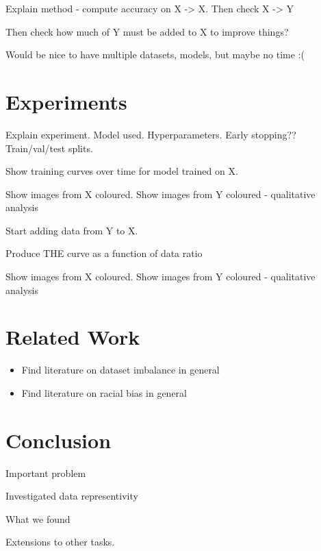 \documentclass[conference]{IEEEtran}
\begin{document}
Explain method - compute accuracy on X -> X.
Then check X -> Y

Then check how much of Y must be added to X to improve things?

Would be nice to have multiple datasets, models, but maybe no time :(

\section{Experiments}

Explain experiment. Model used. Hyperparameters. Early stopping?? Train/val/test splits.

Show training curves over time for model trained on X. 

Show images from X coloured.
Show images from Y coloured - qualitative analysis

Start adding data from Y to X. 

Produce THE curve as a function of data ratio

Show images from X coloured.
Show images from Y coloured - qualitative analysis



\section{Related Work}

\begin{itemize}
    \item Find literature on dataset imbalance in general
    \item Find literature on racial bias in general
\end{itemize}

\section{Conclusion}

Important problem

Investigated data representivity

What we found

Extensions to other tasks.




\end{document}
